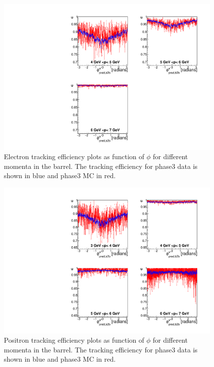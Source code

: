 \documentclass[a4paper,11pt,twosided,final,german,openbib,pdftex,listof=totoc,bibliography=totoc]{scrbook}
\begin{document}
\begin{figure}[!htbp]
	\centering
	\includegraphics[width=\textwidth]{Plots/master3/xPMPhiemBarrelP3}
	\caption[Momentum $\phi$ Electron Barrel Efficiency Phase3]{Electron tracking efficiency plots as function of $\phi$ for different momenta in the barrel. The tracking efficiency for phase3 data is shown in blue and phase3 MC in red.}
	\label{plt:xPMPhiemBarrel3}
\end{figure}


\begin{figure}[!htbp]
	\centering
	\includegraphics[width=\textwidth]{Plots/master3/xPMPhiepBarrelP3}
	\caption[Momentum $\phi$ Positron Barrel Efficiency Phase3]{Positron tracking efficiency plots as function of $\phi$ for different momenta in the barrel. The tracking efficiency for phase3 data is shown in blue and phase3 MC in red.}
	\label{plt:xPMPhiepBarrel3}
\end{figure}
\end{document}
